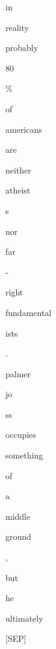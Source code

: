\documentclass[varwidth=150mm]{standalone}
\begin{document}
\begin{CJK*}{UTF8}{gbsn}
{{{\colorbox{red!0.0}{\strut in} \colorbox{red!1.4744157791137695}{\strut reality} \colorbox{red!0.0}{\strut probably} \colorbox{red!0.0}{\strut 80} \colorbox{red!0.0}{\strut \%} \colorbox{red!0.0}{\strut of} \colorbox{red!10.995992660522461}{\strut americans} \colorbox{red!1.2901716232299805}{\strut are} \colorbox{red!1.0146347284317017}{\strut neither} \colorbox{red!2.265174150466919}{\strut atheist}\colorbox{red!1.8333250284194946}{\strut s} \colorbox{red!1.9142670631408691}{\strut nor} \colorbox{red!2.4744873046875}{\strut far} \colorbox{red!1.0343046188354492}{\strut -} \colorbox{red!10.785768508911133}{\strut right} \colorbox{red!1.5933380126953125}{\strut fundamental}\colorbox{red!4.454680919647217}{\strut ists} \colorbox{red!0.0}{\strut .} \colorbox{red!3.045537233352661}{\strut palmer} \colorbox{red!1.0818992853164673}{\strut jo}\colorbox{red!2.0201520919799805}{\strut ss} \colorbox{red!9.979011535644531}{\strut occupies} \colorbox{red!7.7738847732543945}{\strut something} \colorbox{red!3.1717369556427}{\strut of} \colorbox{red!3.686222553253174}{\strut a} \colorbox{red!0.0}{\strut middle} \colorbox{red!1.0690335035324097}{\strut ground} \colorbox{red!0.0}{\strut ,} \colorbox{red!3.0145163536071777}{\strut but} \colorbox{red!21.238515853881836}{\strut he} \colorbox{red!20.084409713745117}{\strut ultimately} \colorbox{red!12.437479019165039}{\strut [SEP]}
}}}
\end{CJK*}
\end{document}
